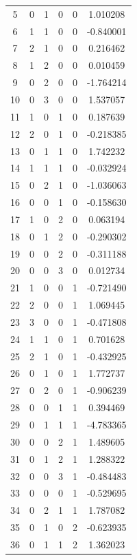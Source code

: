 \documentclass[preprint,12pt]{elsarticle}
\begin{document}
\begin{table}
\begin{minipage}[h!]{0.23\textwidth}
{\begin{tabular}{|c|ccccc|}
5  &   0 &   1 &   0 &   0 &   1.010208 \\
6  &   1 &   1 &   0 &   0 &  -0.840001 \\
7  &   2 &   1 &   0 &   0 &   0.216462 \\
8  &   1 &   2 &   0 &   0 &   0.010459 \\
9  &   0 &   2 &   0 &   0 &  -1.764214 \\
10 &   0 &   3 &   0 &   0 &   1.537057 \\
11 &   1 &   0 &   1 &   0 &   0.187639 \\
12 &   2 &   0 &   1 &   0 &  -0.218385 \\
13 &   0 &   1 &   1 &   0 &   1.742232 \\
14 &   1 &   1 &   1 &   0 &  -0.032924 \\
15 &   0 &   2 &   1 &   0 &  -1.036063 \\
16 &   0 &   0 &   1 &   0 &  -0.158630 \\
17 &   1 &   0 &   2 &   0 &   0.063194 \\
18 &   0 &   1 &   2 &   0 &  -0.290302 \\
19 &   0 &   0 &   2 &   0 &  -0.311188 \\
20 &   0 &   0 &   3 &   0 &   0.012734 \\
21 &   1 &   0 &   0 &   1 &  -0.721490 \\
22 &   2 &   0 &   0 &   1 &   1.069445 \\
23 &   3 &   0 &   0 &   1 &  -0.471808 \\
24 &   1 &   1 &   0 &   1 &   0.701628 \\
25 &   2 &   1 &   0 &   1 &  -0.432925 \\
26 &   0 &   1 &   0 &   1 &   1.772737 \\
27 &   0 &   2 &   0 &   1 &  -0.906239 \\
28 &   0 &   0 &   1 &   1 &   0.394469 \\
29 &   0 &   1 &   1 &   1 &  -4.783365 \\
30 &   0 &   0 &   2 &   1 &   1.489605 \\
31 &   0 &   1 &   2 &   1 &   1.288322 \\
32 &   0 &   0 &   3 &   1 &  -0.484483 \\
33 &   0 &   0 &   0 &   1 &  -0.529695 \\
34 &   0 &   2 &   1 &   1 &   1.787082 \\
35 &   0 &   1 &   0 &   2 &  -0.623935 \\
36 &   0 &   1 &   1 &   2 &   1.362023 \\

\end{tabular}}
\end{minipage}
\end{table}
\end{document}

